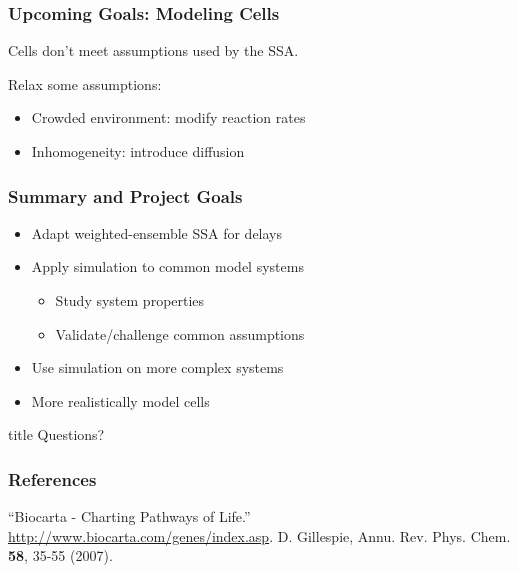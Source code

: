 \documentclass[xcolor={usenames,dvipsnames,svgnames}]{beamer}
\begin{document}
\begin{frame}
    \frametitle{Upcoming Goals: Modeling Cells}
    Cells don't meet assumptions used by the SSA.

    Relax some assumptions:
    \begin{itemize}
        \item Crowded environment: modify reaction rates
        \item Inhomogeneity: introduce diffusion
    \end{itemize}
\end{frame}

\begin{frame}
    \frametitle{Summary and Project Goals}
    \begin{itemize}
        \item Adapt weighted-ensemble SSA for delays
        \item Apply simulation to common model systems
        \begin{itemize}
            \item Study system properties
            \item Validate/challenge common assumptions
        \end{itemize}
        \item Use simulation on more complex systems
        \item More realistically model cells
    \end{itemize}
\end{frame}

\begin{frame}[plain]

\hfill
    \begin{beamercolorbox}[rounded=true, center, shadow=true,wd=6cm]{title}
        \huge Questions?
    \end{beamercolorbox}
\hfill\hfill

\end{frame}

\appendix

\begin{frame}
    \frametitle{References}
    \begin{thebibliography}{9}
         ``Biocarta - Charting Pathways of Life.'' \url{http://www.biocarta.com/genes/index.asp}.
         D. Gillespie, Annu. Rev. Phys. Chem. \textbf{58}, 35-55 (2007).
        
    \end{thebibliography}
\end{frame}
\end{document}
